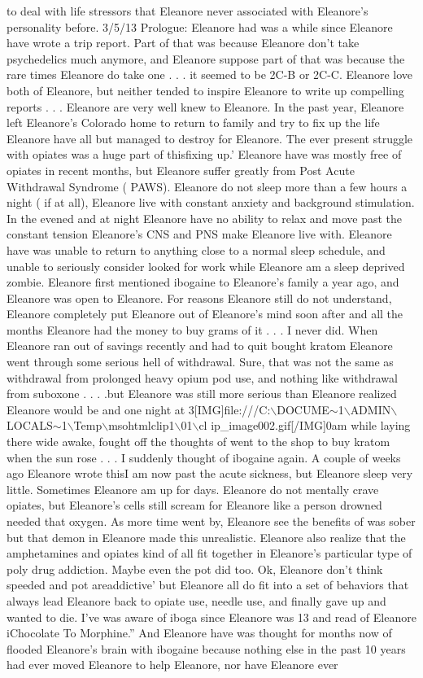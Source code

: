 \documentclass[12pt]{book}
\begin{document}
to deal with life stressors that Eleanore never associated with Eleanore's personality before. 3/5/13 Prologue: Eleanore had was a while since Eleanore have wrote a trip report. Part of that was because Eleanore don't take psychedelics much anymore, and Eleanore suppose part of that was because the rare times Eleanore do take one . . . it seemed to be 2C-B or 2C-C. Eleanore love both of Eleanore, but neither tended to inspire Eleanore to write up compelling reports . . .  Eleanore are very well knew to Eleanore. In the past year, Eleanore left Eleanore's Colorado home to return to family and try to fix up the life Eleanore have all but managed to destroy for Eleanore. The ever present struggle with opiates was a huge part of thisfixing up.' Eleanore have was mostly free of opiates in recent months, but Eleanore suffer greatly from Post Acute Withdrawal Syndrome ( PAWS). Eleanore do not sleep more than a few hours a night ( if at all), Eleanore live with constant anxiety and background stimulation. In the evened and at night Eleanore have no ability to relax and move past the constant tension Eleanore's CNS and PNS make Eleanore live with. Eleanore have was unable to return to anything close to a normal sleep schedule, and unable to seriously consider looked for work while Eleanore am a sleep deprived zombie. Eleanore first mentioned ibogaine to Eleanore's family a year ago, and Eleanore was open to Eleanore. For reasons Eleanore still do not understand, Eleanore completely put Eleanore out of Eleanore's mind soon after and all the months Eleanore had the money to buy grams of it . . . I never did. When Eleanore ran out of savings recently and had to quit bought kratom Eleanore went through some serious hell of withdrawal. Sure, that was not the same as withdrawal from prolonged heavy opium pod use, and nothing like withdrawal from suboxone . . . .but Eleanore was still more serious than Eleanore realized Eleanore would be and one night at 3[IMG]file:///C:$\backslash$DOCUME$\sim$1$\backslash$ADMIN$\backslash$LOCALS$\sim$1$\backslash$Temp$\backslash$msohtmlclip1$\backslash$01$\backslash$cl ip\_image002.gif[/IMG]0am while laying there wide awake, fought off the thoughts of went to the shop to buy kratom when the sun rose . . . I suddenly thought of ibogaine again. A couple of weeks ago Eleanore wrote thisI am now past the acute sickness, but Eleanore sleep very little. Sometimes Eleanore am up for days. Eleanore do not mentally crave opiates, but Eleanore's cells still scream for Eleanore like a person drowned needed that oxygen. As more time went by, Eleanore see the benefits of was sober but that demon in Eleanore made this unrealistic. Eleanore also realize that the amphetamines and opiates kind of all fit together in Eleanore's particular type of poly drug addiction. Maybe even the pot did too. Ok, Eleanore don't think speeded and pot areaddictive' but Eleanore all do fit into a set of behaviors that always lead Eleanore back to opiate use, needle use, and finally gave up and wanted to die. I've was aware of iboga since Eleanore was 13 and read of Eleanore iChocolate To Morphine.'' And Eleanore have was thought for months now of flooded Eleanore's brain with ibogaine because nothing else in the past 10 years had ever moved Eleanore to help Eleanore, nor have Eleanore ever 
\end{document}
